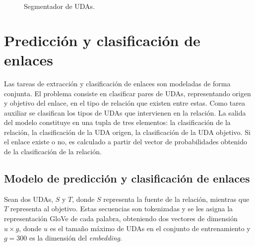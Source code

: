 \documentclass[a4paper,11pt,twocolumn,twoside]{article}
\begin{document}
\begin{figure}[h]
	\centering
	
	\caption{Segmentador de UDAs.}
	\label{fig:segmenter_model}
\end{figure}

\section{Predicción y clasificación de enlaces}


	
Las tareas de extracción y clasificación de enlaces son modeladas de forma conjunta.
El problema consiste en clasificar pares de UDAs, representando origen y objetivo del enlace, 
en el tipo de relación que existen entre estas.
Como tarea auxiliar se clasifican los tipos de UDAs que intervienen en la relación. La salida 
del modelo constituye en una tupla de tres elementos: la clasificación de la relación, 
la clasificación de la UDA origen, la clasificación de la UDA objetivo. Si el enlace
existe o no, es calculado a partir del vector de probabilidades obtenido de la clasificación de la relación.

\subsection{Modelo de predicción y clasificación de enlaces}\label{ssec:pred_clsf_enlaces}

Sean dos UDAs, $S$ y $T$, donde $S$ representa la fuente de la relación, mientras que $T$ representa
al objetivo. Estas secuencias son tokenizadas y se les asigna la representación GloVe de cada palabra, obteniendo
dos vectores de dimensión $u \times g$, donde $u$ es el tamaño máximo de UDAs en el conjunto de entrenamiento
y $g=300$ es la dimensión del \textit{embedding}.
\end{document}
